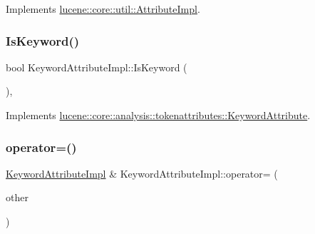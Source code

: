 Implements \mbox{\hyperlink{classlucene_1_1core_1_1util_1_1AttributeImpl_a135318ad4c7c17b3d85e625e32fb42cd}{lucene\+::core\+::util\+::\+Attribute\+Impl}}.

\mbox{\label{classlucene_1_1core_1_1analysis_1_1tokenattributes_1_1KeywordAttributeImpl_aa98aa28fbea635057a71d0129cb92a2e}} 
\subsubsection{\texorpdfstring{Is\+Keyword()}{IsKeyword()}}
{\footnotesize\ttfamily bool Keyword\+Attribute\+Impl\+::\+Is\+Keyword (\begin{DoxyParamCaption}{ }\end{DoxyParamCaption})\hspace{0.3cm}{\ttfamily [override]}, {\ttfamily [virtual]}}



Implements \mbox{\hyperlink{classlucene_1_1core_1_1analysis_1_1tokenattributes_1_1KeywordAttribute_af6270bf727324f1809a18a1fc9b1a27c}{lucene\+::core\+::analysis\+::tokenattributes\+::\+Keyword\+Attribute}}.

\mbox{\label{classlucene_1_1core_1_1analysis_1_1tokenattributes_1_1KeywordAttributeImpl_a30228ce41cc678c1cb85c2fb1179f447}} 
\subsubsection{\texorpdfstring{operator=()}{operator=()}\hspace{0.1cm}{\footnotesize\ttfamily [1/2]}}
{\footnotesize\ttfamily \mbox{\hyperlink{classlucene_1_1core_1_1analysis_1_1tokenattributes_1_1KeywordAttributeImpl}{Keyword\+Attribute\+Impl}} \& Keyword\+Attribute\+Impl\+::operator= (\begin{DoxyParamCaption}\item[{\mbox{\hyperlink{ZlibCrc32_8h_a2c212835823e3c54a8ab6d95c652660e}{const}} \mbox{\hyperlink{classlucene_1_1core_1_1util_1_1AttributeImpl}{lucene\+::core\+::util\+::\+Attribute\+Impl}} \&}]{other }\end{DoxyParamCaption})\hspace{0.3cm}{\ttfamily [virtual]}}



